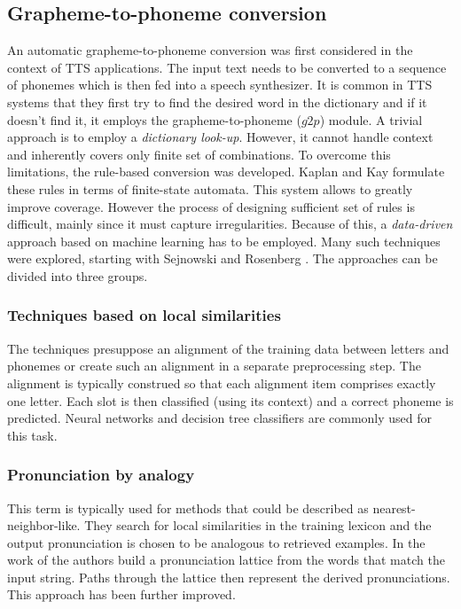 \subsection{Grapheme-to-phoneme conversion}
An automatic grapheme-to-phoneme conversion was first considered in the context of TTS applications. The input text needs to be converted to a sequence of phonemes which is then fed into a speech synthesizer.
It is common in TTS systems that they first try to find the desired word in the dictionary and if it doesn't find it, it employs the grapheme-to-phoneme ($g2p$) module.
A trivial approach is to employ a \textit{dictionary look-up}.
However, it cannot handle context and inherently covers only finite set of combinations.
To overcome this limitations, the rule-based conversion was developed.
Kaplan and Kay \cite{kaplan1994regular} formulate these rules in terms of finite-state automata.
This system allows to greatly improve coverage.
However the process of designing sufficient set of rules is difficult, mainly since it must capture irregularities.
Because of this, a \textit{data-driven} approach based on machine learning has to be employed.
Many such techniques were explored, starting with Sejnowski and Rosenberg \cite{sejnowski1988nettalk}.
The approaches can be divided into three groups.
\subsubsection{Techniques based on local similarities}
The techniques presuppose an alignment of the training data between letters and phonemes or create such an alignment in a separate preprocessing step.
The alignment is typically construed so that each alignment item comprises exactly one letter.
Each slot is then classified (using its context) and a correct phoneme is predicted.
Neural networks and decision tree classifiers are commonly used for this task.
\subsubsection{Pronunciation by analogy}
This term is typically used for methods that could be described as nearest-neighbor-like.
They search for local similarities in the training lexicon and the output pronunciation is chosen to be analogous to retrieved examples. 
In the work of \cite{dedina1991pronounce} the authors build a pronunciation lattice from the words that match the input string.
Paths through the lattice then represent the derived pronunciations.
This approach has been further improved.
